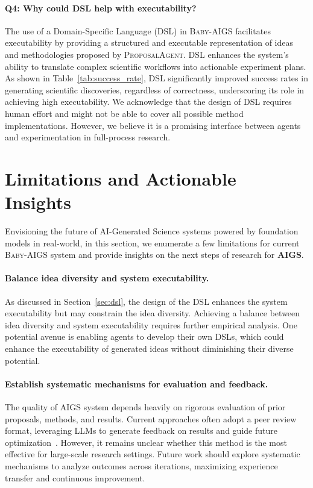 \documentclass{article} %
\newcommand{\AIGSFull}{AI-Generated Science\xspace}
\newcommand{\AIGS}{AIGS\xspace}
\newcommand{\AIGSSys}{\textsc{Baby-AIGS}\xspace}
\newcommand{\ProposalAgent}{\textsc{ProposalAgent}\xspace}
\newcommand{\DSL}{\textsc{DSL}\xspace}
\begin{document}
\paragraph{\textbf{Q4: Why could \DSL help with executability?}}

The use of a Domain-Specific Language (\DSL) in \AIGSSys facilitates executability by providing a structured and executable representation of ideas and methodologies proposed by \ProposalAgent. \DSL enhances the system’s ability to translate complex scientific workflows into actionable experiment plans. As shown in Table~\ref{tab:success_rate}, \DSL significantly improved success rates in generating scientific discoveries, regardless of correctness, underscoring its role in achieving high executability. We acknowledge that the design of \DSL requires human effort and might not be able to cover all possible method implementations. However, we believe it is a promising interface between agents and experimentation in full-process research. 


\section{Limitations and Actionable Insights}
\label{sec:actionableinsights}

Envisioning the future of \AIGSFull systems powered by foundation models in real-world, in this section, we enumerate a few limitations for current \AIGSSys system and provide insights on the next steps of research for \textbf{\AIGS}.

\paragraph{Balance idea diversity and system executability.}
As discussed in Section~\ref{sec:dsl}, the design of the \DSL enhances the system executability but may constrain the idea diversity.
Achieving a balance between idea diversity and system executability requires further empirical analysis.
One potential avenue is enabling agents to develop their own DSLs, which could enhance the executability of generated ideas without diminishing their diverse potential.

\paragraph{Establish systematic mechanisms for evaluation and feedback.}
The quality of \AIGS system depends heavily on rigorous evaluation of prior proposals, methods, and results.
Current approaches often adopt a peer review format, leveraging LLMs to generate feedback on results and guide future optimization~\citep{lu2024aiscientist, yu2024automated, jin2024agentreview}.
However, it remains unclear whether this method is the most effective for large-scale research settings.
Future work should explore systematic mechanisms to analyze outcomes across iterations, maximizing experience transfer and continuous improvement.
\end{document}
